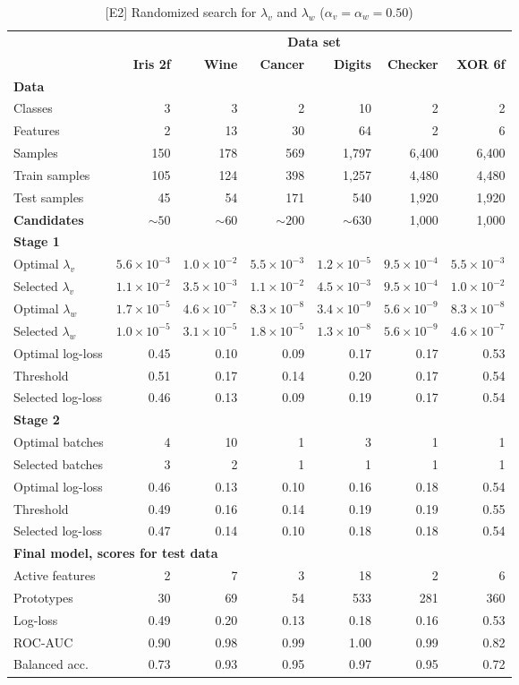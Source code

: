 %
\begin{table}
\caption{[E2] Randomized search for $\lambda_v$ and $\lambda_w$ ($\alpha_v=\alpha_w=0.50$)}
\label{tab_e2}
%
\begin{center}
\small
\begin{tabular}{|lrrrrrr|}
\hline
&\multicolumn{6}{c|}{\textbf{\hrulefill\ Data set \hrulefill}}\\
&\textbf{Iris 2f}&\textbf{Wine}&\textbf{Cancer}&\textbf{Digits}&\textbf{Checker}&\textbf{XOR 6f}\\
\multicolumn{7}{|l|}{\textbf{Data}}\\
Classes&3&3&2&10&2&2\\
Features&2&13&30&64&2&6\\
Samples&150&178&569&1,797&6,400&6,400\\
Train samples&105&124&398&1,257&4,480&4,480\\
Test samples&45&54&171&540&1,920&1,920\\
\textbf{Candidates}&$\sim50$&$\sim60$&$\sim200$&$\sim630$&1,000&1,000\\
\multicolumn{7}{|l|}{\textbf{Stage 1}}\\
Optimal $\lambda_v$&$5.6\times10^{-3}$&$1.0\times10^{-2}$&$5.5\times10^{-3}$&$1.2\times10^{-5}$&$9.5\times10^{-4}$&$5.5\times10^{-3}$\\
Selected $\lambda_v$&$1.1\times10^{-2}$&$3.5\times10^{-3}$&$1.1\times10^{-2}$&$4.5\times10^{-3}$&$9.5\times10^{-4}$&$1.0\times10^{-2}$\\
Optimal $\lambda_w$&$1.7\times10^{-5}$&$4.6\times10^{-7}$&$8.3\times10^{-8}$&$3.4\times10^{-9}$&$5.6\times10^{-9}$&$8.3\times10^{-8}$\\
Selected $\lambda_w$&$1.0\times10^{-5}$&$3.1\times10^{-5}$&$1.8\times10^{-5}$&$1.3\times10^{-8}$&$5.6\times10^{-9}$&$4.6\times10^{-7}$\\
Optimal log-loss&0.45&0.10&0.09&0.17&0.17&0.53\\
Threshold&0.51&0.17&0.14&0.20&0.17&0.54\\
Selected log-loss&0.46&0.13&0.09&0.19&0.17&0.54\\
\multicolumn{7}{|l|}{\textbf{Stage 2}}\\
Optimal batches&4&10&1&3&1&1\\
Selected batches&3&2&1&1&1&1\\
Optimal log-loss&0.46&0.13&0.10&0.16&0.18&0.54\\
Threshold&0.49&0.16&0.14&0.19&0.19&0.55\\
Selected log-loss&0.47&0.14&0.10&0.18&0.18&0.54\\
\multicolumn{7}{|l|}{\textbf{Final model, scores for test data}}\\
Active features&2&7&3&18&2&6\\
Prototypes&30&69&54&533&281&360\\
Log-loss&0.49&0.20&0.13&0.18&0.16&0.53\\
ROC-AUC&0.90&0.98&0.99&1.00&0.99&0.82\\
Balanced acc.&0.73&0.93&0.95&0.97&0.95&0.72\\
\hline
\end{tabular}
\end{center}
\end{table}
